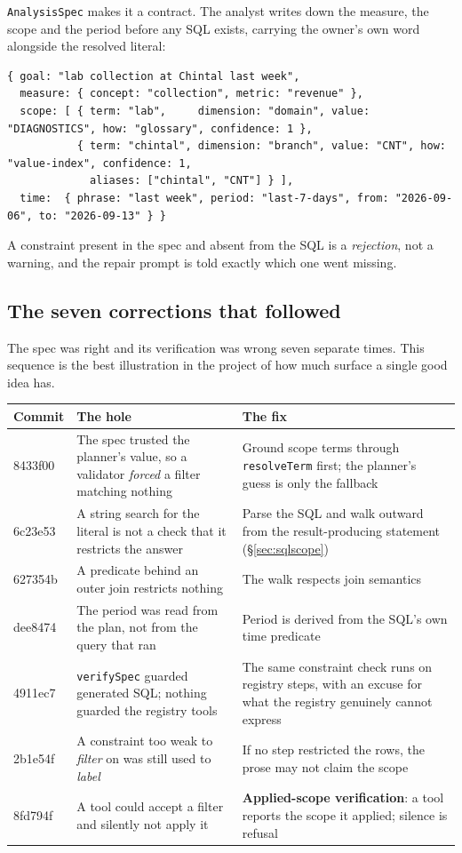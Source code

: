 \documentclass[11pt,a4paper]{report}
\newcommand{\code}[1]{\texttt{\small #1}}
\newcommand{\sha}[1]{{\ttfamily\small\color{slate}#1}}
\begin{document}
\code{AnalysisSpec} makes it a contract. The analyst writes down the measure, the scope and the
period before any SQL exists, carrying the owner's own word alongside the resolved literal:

\begin{lstlisting}
{ goal: "lab collection at Chintal last week",
  measure: { concept: "collection", metric: "revenue" },
  scope: [ { term: "lab",     dimension: "domain", value: "DIAGNOSTICS", how: "glossary", confidence: 1 },
           { term: "chintal", dimension: "branch", value: "CNT", how: "value-index", confidence: 1,
             aliases: ["chintal", "CNT"] } ],
  time:  { phrase: "last week", period: "last-7-days", from: "2026-09-06", to: "2026-09-13" } }
\end{lstlisting}

A constraint present in the spec and absent from the SQL is a \emph{rejection}, not a warning, and
the repair prompt is told exactly which one went missing.

\subsection{The seven corrections that followed}

The spec was right and its verification was wrong seven separate times. This sequence is the best
illustration in the project of how much surface a single good idea has.

\begin{center}
\small
\begin{tabular}{@{}p{1.4cm}p{5.6cm}p{7.8cm}@{}}
\toprule
\textbf{Commit} & \textbf{The hole} & \textbf{The fix}\\
\midrule
\sha{8433f00} & The spec trusted the planner's value, so a validator \emph{forced} a filter matching nothing & Ground scope terms through \code{resolveTerm} first; the planner's guess is only the fallback\\
\sha{6c23e53} & A string search for the literal is not a check that it restricts the answer & Parse the SQL and walk outward from the result-producing statement (\S\ref{sec:sqlscope})\\
\sha{627354b} & A predicate behind an outer join restricts nothing & The walk respects join semantics\\
\sha{dee8474} & The period was read from the plan, not from the query that ran & Period is derived from the SQL's own time predicate\\
\sha{4911ec7} & \code{verifySpec} guarded generated SQL; nothing guarded the registry tools & The same constraint check runs on registry steps, with an excuse for what the registry genuinely cannot express\\
\sha{2b1e54f} & A constraint too weak to \emph{filter} on was still used to \emph{label} & If no step restricted the rows, the prose may not claim the scope\\
\sha{8fd794f} & A tool could accept a filter and silently not apply it & \textbf{Applied-scope verification}: a tool reports the scope it applied; silence is refusal\\
\bottomrule
\end{tabular}
\end{center}
\end{document}
